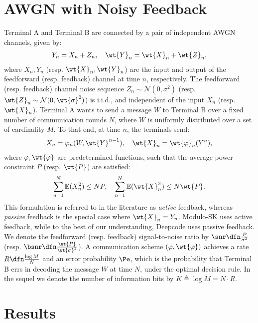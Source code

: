 \section{AWGN with Noisy Feedback}
Terminal A and Terminal B are connected by a pair of independent AWGN channels, given by:
\begin{align}
Y_n=X_n+Z_n ,\quad \wt{Y}_n=\wt{X}_n+\wt{Z}_n,
\end{align}
where $X_n, Y_n$ (resp. $\wt{X}_n,\wt{Y}_n$) are the input and output of the feedforward (resp. feedback) channel at time $n$, respectively. The feedforward (resp. feedback) channel noise sequence $Z_n\sim \mathcal{N}(0,\sigma^2)$ (resp. $\wt{Z}_n\sim \mathcal{N}(0,\wt{\sigma}^2)$) is i.i.d., and independent of the input $X_n$ (resp. $\wt{X}_n$). Terminal A wants to send a message $W$ to Terminal B over a fixed number of communication rounds $N$, where $W$ is uniformly distributed over a set of cardinality $M$. To that end, at time $n$, the terminals send: 
\begin{align}
 X_n=\varphi_n(W,\wt{Y}^{n-1}), \quad \wt{X}_n=\wt{\varphi}_n(Y^n), 
\end{align}
where $\varphi,\wt{\varphi}$ are predetermined functions, 
such that the average power constraint $P$ (resp. $\wt{P}$) are satisfied: 
\begin{align}

\sum_{n=1}^N\mathbb{E}(X_n^2) \leq N P, \quad \sum_{n=1}^N\mathbb{E}(\wt{X}_n^2) \leq N \wt{P} .
\end{align}
This formulation is referred to in the literature as \textit{active} feedback, whereas \textit{passive} feedback is the special case where $\wt{X}_n=Y_n$. Modulo-SK uses active feedback, while to the best of our understanding, Deepcode uses passive feedback. We denote the feedforward (resp. feedback) signal-to-noise ratio by $\snr\dfn\frac{P}{\sigma^2}$ 
(resp. $\bsnr\dfn \frac{\wt{P}}{\wt{\sigma}^2}$). 
A communication scheme $(\varphi,\wt{\varphi})$ achieves a rate $R\dfn \frac{\log{M}}{N}$ and an error probability $\Pe$, which is the probability that Terminal B errs in decoding the message $W$ at time $N$, under the optimal decision rule.
{In the sequel we denote the number of information bits by $K\triangleq \log M=N\cdot R$.}
\newline
\section{Results}

